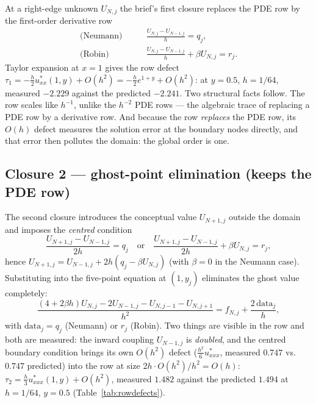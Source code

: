 \documentclass[11pt,a4paper]{article}
\begin{document}
At a right-edge unknown $U_{N,j}$ the brief's first closure replaces the PDE
row by the first-order derivative row
\begin{align}
\text{(Neumann)}\qquad
&\frac{U_{N,j} - U_{N-1,j}}{h} = q_j,
\label{eq:onesided-n}\\
\text{(Robin)}\qquad
&\frac{U_{N,j} - U_{N-1,j}}{h} + \beta U_{N,j} = r_j.
\label{eq:onesided-r}
\end{align}
Taylor expansion at $x=1$ gives the row defect
$\tau_1 = -\frac{h}{2} u^*_{xx}(1,y) + O(h^2) = -\frac{h}{2} e^{1+y} +
O(h^2)$: at $y = 0.5$, $h = 1/64$, measured $-2.229$ against the predicted
$-2.241$. Two structural facts follow. The row scales like $h^{-1}$, unlike
the $h^{-2}$ PDE rows --- the algebraic trace of replacing a PDE row by a
derivative row. And because the row \emph{replaces} the PDE row, its $O(h)$
defect measures the solution error at the boundary nodes directly, and that
error then pollutes the domain: the global order is one.

\subsection{Closure 2 --- ghost-point elimination (keeps the PDE row)}
\label{sec:ghost}

The second closure introduces the conceptual value $U_{N+1,j}$ outside the
domain and imposes the \emph{centred} condition
\begin{equation}
\frac{U_{N+1,j} - U_{N-1,j}}{2h} = q_j
\quad\text{or}\quad
\frac{U_{N+1,j} - U_{N-1,j}}{2h} + \beta U_{N,j} = r_j,
\end{equation}
hence $U_{N+1,j} = U_{N-1,j} + 2h(q_j - \beta U_{N,j})$ (with $\beta = 0$ in
the Neumann case). Substituting into the five-point equation at $(1,y_j)$
eliminates the ghost value completely:
\begin{equation}\label{eq:ghost-row}
\frac{(4 + 2\beta h) U_{N,j} - 2U_{N-1,j} - U_{N,j-1} - U_{N,j+1}}{h^2}
= f_{N,j} + \frac{2\,\mathrm{data}_j}{h},
\end{equation}
with $\mathrm{data}_j = q_j$ (Neumann) or $r_j$ (Robin). Two things are
visible in the row and both are measured: the inward coupling $U_{N-1,j}$ is
\emph{doubled}, and the centred boundary condition brings its own
$O(h^2)$ defect ($\frac{h^2}{6}u^*_{xxx}$, measured $0.747$ vs.\ $0.747$
predicted) into the row at size $2h\cdot O(h^2)/h^2 = O(h)$:
$\tau_2 = \frac{h}{3} u^*_{xxx}(1,y) + O(h^2)$, measured $1.482$ against the
predicted $1.494$ at $h = 1/64$, $y = 0.5$ (Table~\ref{tab:rowdefects}).
\end{document}
